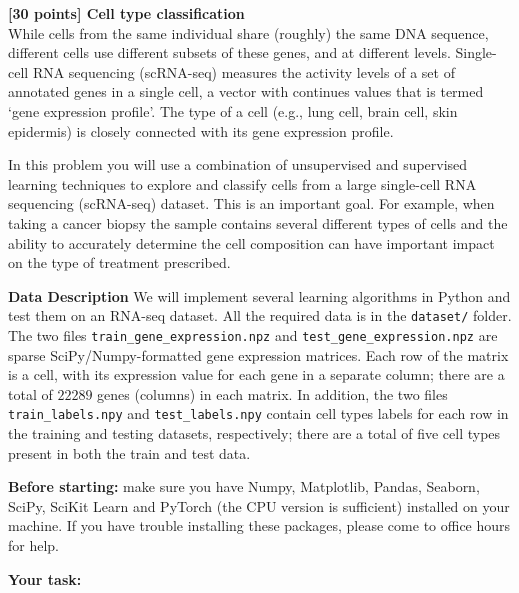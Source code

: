 {\bf [30 points] Cell type classification}\\
While cells from the same individual share (roughly) the same DNA
sequence, different cells use different subsets of these genes,
and at different levels. Single-cell RNA sequencing (scRNA-seq) measures the
activity levels of a set of annotated genes in a single cell, a vector with continues
values that is termed ‘gene expression profile’. The type of a cell (e.g., lung cell,
brain cell, skin epidermis) is closely connected with its gene expression profile.

In this problem you will use a combination of unsupervised and supervised learning techniques to explore and classify cells from a large single-cell RNA sequencing (scRNA-seq) dataset. This is an important goal. For example, when taking a cancer biopsy the sample contains several different
types of cells and the ability to accurately determine the cell composition can
have important impact on the type of treatment prescribed. 

\textbf{Data Description}
We will implement several learning algorithms in Python and test them on an RNA-seq dataset. All the required data is in the \texttt{dataset/} folder. The two files \texttt{train\_gene\_expression.npz} and \texttt{test\_gene\_expression.npz} are sparse SciPy/Numpy-formatted gene expression matrices. Each row of the matrix is a cell, with its expression value for each gene in a separate column; there are a total of $22289$ genes (columns) in each matrix. In addition, the two files \texttt{train\_labels.npy} and \texttt{test\_labels.npy} contain cell types labels for each row in the training and testing datasets, respectively; there are a total of five cell types present in both the train and test data.

\textbf{Before starting:} make sure you have Numpy, Matplotlib, Pandas, Seaborn, SciPy, SciKit Learn and PyTorch (the CPU version is sufficient) installed on your machine. If you have trouble installing these packages, please come to office hours for help.

\textbf{Your task:}


